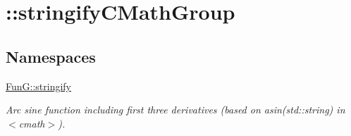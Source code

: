 \hypertarget{group__std}{\section{\-:\-:stringify\-C\-Math\-Group}
\label{group__std}
}
\subsection*{Namespaces}
\begin{DoxyCompactItemize}
\item 
\hyperlink{namespaceFunG_1_1stringify}{Fun\-G\-::stringify}
\begin{DoxyCompactList}\small\item\em Arc sine function including first three derivatives (based on asin(std\-::string) in $<$cmath$>$). \end{DoxyCompactList}\end{DoxyCompactItemize}
